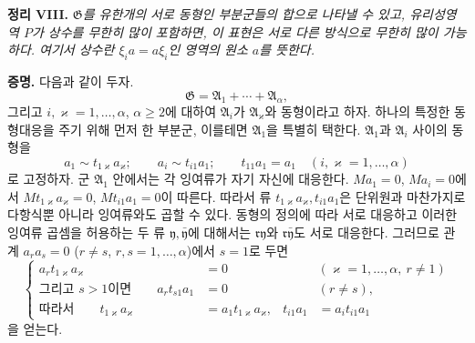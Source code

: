 \textbf{정리 VIII.} \emph{\(\mathfrak G\)를 유한개의 서로 동형인 부분군들의 합으로 나타낼 수 있고, 유리성영역 \(P\)가 상수를 무한히 많이 포함하면, 이 표현은 서로 다른 방식으로 무한히 많이 가능하다. 여기서 상수란 \(\xi_i a=a\xi_i\)인 영역의 원소 \(a\)를 뜻한다.}

\textbf{증명.} 다음과 같이 두자.
\[
 \mathfrak G=\mathfrak A_1+\cdots+\mathfrak A_\alpha,
\]
그리고 \(i,\varkappa=1,\ldots,\alpha\), \(\alpha\geq2\)에 대하여 \(\mathfrak A_i\)가 \(\mathfrak A_\varkappa\)와 동형이라고 하자. 하나의 특정한 동형대응을 주기 위해 먼저 한 부분군, 이를테면 \(\mathfrak A_1\)을 특별히 택한다. \(\mathfrak A_1\)과 \(\mathfrak A_i\) 사이의 동형을
\begin{equation}
 a_1\sim t_{1\varkappa}a_\varkappa;\qquad
 a_i\sim t_{i1}a_1;\qquad
 t_{11}a_1=a_1
 \quad(i,\varkappa=1,\ldots,\alpha)
\tag{31}
\end{equation}
로 고정하자. 군 \(\mathfrak A_1\) 안에서는 각 잉여류가 자기 자신에 대응한다. \(Ma_1=0\), \(Ma_i=0\)에서 \(Mt_{1\varkappa}a_\varkappa=0\), \(Mt_{i1}a_1=0\)이 따른다. 따라서 류 \(t_{1\varkappa}a_\varkappa,t_{i1}a_1\)은 단위원과 마찬가지로 다항식뿐 아니라 잉여류와도 곱할 수 있다. 동형의 정의에 따라 서로 대응하고 이러한 잉여류 곱셈을 허용하는 두 류 \(\mathfrak y,\bar{\mathfrak y}\)에 대해서는 \(\mathfrak r\mathfrak y\)와 \(\mathfrak r\bar{\mathfrak y}\)도 서로 대응한다. 그러므로 관계 \(a_ra_s=0\) (\(r\ne s\), \(r,s=1,\ldots,\alpha\))에서 \(s=1\)로 두면
\begin{equation}
\left\{
\begin{aligned}
 a_r t_{1\varkappa}a_\varkappa&=0
 &&(\varkappa=1,\ldots,\alpha,\ r\ne1)\\
 \text{그리고 \(s>1\)이면}\qquad
 a_r t_{s1}a_1&=0 &&(r\ne s),\\
 \text{따라서}\qquad
 t_{1\varkappa}a_\varkappa&=a_1t_{1\varkappa}a_\varkappa,
 &t_{i1}a_1&=a_it_{i1}a_1
\end{aligned}\right.
\tag{32}
\end{equation}
을 얻는다.

